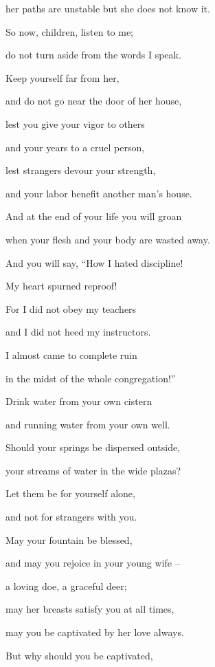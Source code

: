 {\par }{\Q her paths are unstable
but she
does not
know it.
\par }{\Q {}So now,
children,
listen
to me;
\par }{\Q do not
turn aside
from the words
I speak.
\par }{\Q {}Keep yourself far
from her,
\par }{\Q and do
not
go near
the door
of her house,
\par }{\Q {}lest
you give
your vigor
to others
\par }{\Q and your years
to a cruel person,
\par }{\Q {}lest
strangers
devour your strength,
\par }{\Q and your labor benefit
another man’s
house.
\par }{\Q {}And at the end
of your life you will groan
\par }{\Q when your flesh
and your body
are wasted away.
\par }{\Q {}And you will say,
“How
I hated
discipline!
\par }{\Q My heart
spurned
reproof!
\par }{\Q {}For I did not
obey
my teachers
\par }{\Q and I did not
heed
my instructors.
\par }{\Q {}I almost
came to complete ruin
\par }{\Q in the midst
of the whole
congregation!”
\par }{\Q {}Drink
water
from your own cistern
\par }{\Q and running
water from your own well.
\par }{\Q {}Should your springs
be dispersed
outside,
\par }{\Q your streams
of water
in the wide plazas?
\par }{\Q {}Let them be
for yourself alone,
\par }{\Q and not
for strangers
with you.
\par }{\Q {}May
your fountain
be blessed,
\par }{\Q and may you rejoice
in your young
wife –
\par }{\Q {}a loving
doe,
a graceful
deer;
\par }{\Q may her breasts
satisfy
you at all
times,
\par }{\Q may you be captivated
by her love
always.
\par }{\Q {}But why
should you be captivated,
}
